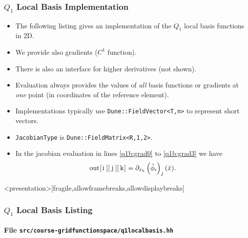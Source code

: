\begin{frame}
\end{frame}

\begin{frame}[fragile]
\frametitle{$Q_1$ Local Basis Implementation}
\begin{itemize}
\item The following listing gives an implementation of the $Q_1$ local basis
functions in 2D. 
\item We provide also gradients ($C^1$ function).
\item There is also an interface for higher derivatives (not shown).
\item Evaluation always provides the values of \textit{all} basis functions
or gradients at \textit{one} point (in coordinates of the reference element). 
\item Implementations typically use \lstinline{Dune::FieldVector<T,n>} to
represent short vectors.
\item \lstinline{JacobianType} is \lstinline{Dune::FieldMatrix<R,1,2>}.
\item In the jacobian evaluation in lines \ref{q1b:grad0} to \ref{q1b:grad3}
we have
\begin{equation*}
\text{\lstinline{out[i][j][k]}}
= \partial_{\hat{x}_k} \left(\hat\phi_i\right)_j (\hat{x}) . 
\end{equation*}
\end{itemize}
\end{frame}


\begin{frame}<presentation>[fragile,allowframebreaks,allowdisplaybreaks]
\frametitle<presentation>{$Q_1$ Local Basis Listing}
\framesubtitle<presentation>{File \texttt{src/course-gridfunctionspace/q1localbasis.hh}}

\end{frame}


